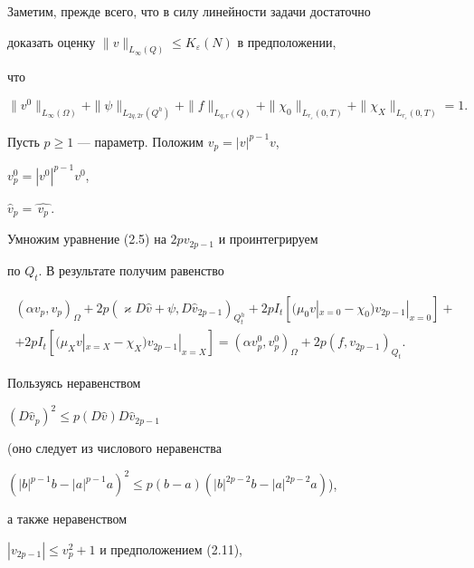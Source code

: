 \documentclass[12pt]{article}
\theoremstyle{plain} %
\theoremstyle{definition}
\numberwithin{equation}{section}
\begin{document}
\begin{pf} Заметим, прежде всего, что в силу линейности задачи достаточно


доказать оценку $\|v\|_{L_\infty(Q)}\le K_\varepsilon(N)$ в предположении,


что


\begin{equation}


\|v^0\|_{L_\infty(\Omega)}+


\|\psi\|_{L_{2q,2r}(Q^h)}+\|f\|_{L_{q,r}(Q)}


+\|\chi_0\|_{L_{r_\varepsilon}(0,T)}+


\|\chi_X\|_{L_{r_\varepsilon}(0,T)}=1.


\end{equation}





Пусть $p\ge 1$ --- параметр. Положим $v_p=|v|^{p-1}v$,


$v_p^0=|v^0|^{p-1}v^0$,


$\widehat v_p=\widehat{\,v_p\,}$.


Умножим уравнение (2.5) на $2pv_{2p-1}$ и проинтегрируем


по $Q_t$. В результате получим равенство


\begin{multline}


(\alpha v_p,v_p)_\Omega+


2p (\varkappa D\widehat v+\psi,D\widehat v_{2p-1})_{Q^h_t}


+2p I_t[(\mu_0 v|_{x=0}-\chi_0)v_{2p-1}|_{x=0}]+\\


%


+2p I_t[(\mu_X v|_{x=X}-\chi_X)v_{2p-1}|_{x=X}]=


(\alpha v_p^0,v_p^0)_\Omega+


2p (f,v_{2p-1})_{Q_t}.


\end{multline}


Пользуясь неравенством


$(D\widehat v_p)^2\le p (D\widehat v) D\widehat v_{2p-1}$


(оно следует из числового неравенства


$(|b|^{p-1}b-|a|^{p-1}a)^2\le p(b-a)(|b|^{2p-2}b-|a|^{2p-2}a)$),


а также неравенством


$|v_{2p-1}|\le v_p^2+1$ и предположением (2.11),



\end{pf}
\end{document}
